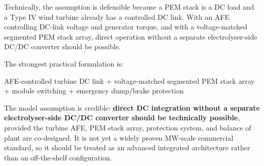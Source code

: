 \documentclass[
  letterpaper,
  DIV=11,
  numbers=noendperiod]{scrartcl}
\newenvironment{Shaded}{\begin{snugshade}}{\end{snugshade}}
\newcommand{\NormalTok}[1]{\textcolor[rgb]{0.00,0.23,0.31}{#1}}
\begin{document}
Technically, the assumption is defensible because a PEM stack is a DC
load and a Type IV wind turbine already has a controlled DC link. With
an AFE controlling DC-link voltage and generator torque, and with a
voltage-matched segmented PEM stack array, direct operation without a
separate electrolyser-side DC/DC converter should be possible.

The strongest practical formulation is:

\begin{Shaded}
\begin{Highlighting}[]
\NormalTok{AFE{-}controlled turbine DC link + voltage{-}matched segmented PEM stack array + module switching + emergency dump/brake protection}
\end{Highlighting}
\end{Shaded}

\begin{tcolorbox}[enhanced jigsaw, arc=.35mm, bottomrule=.15mm, bottomtitle=1mm, breakable, colback=white, colbacktitle=quarto-callout-important-color!10!white, colframe=quarto-callout-important-color-frame, coltitle=black, left=2mm, leftrule=.75mm, opacityback=0, opacitybacktitle=0.6, rightrule=.15mm, title=\textcolor{quarto-callout-important-color}{\faExclamation}\hspace{0.5em}{Feasibility statement}, titlerule=0mm, toprule=.15mm, toptitle=1mm]

The model assumption is credible: \textbf{direct DC integration without
a separate electrolyser-side DC/DC converter should be technically
possible}, provided the turbine AFE, PEM stack array, protection system,
and balance of plant are co-designed. It is not yet a widely proven
MW-scale commercial standard, so it should be treated as an advanced
integrated architecture rather than an off-the-shelf configuration.

\end{tcolorbox}
\end{document}
